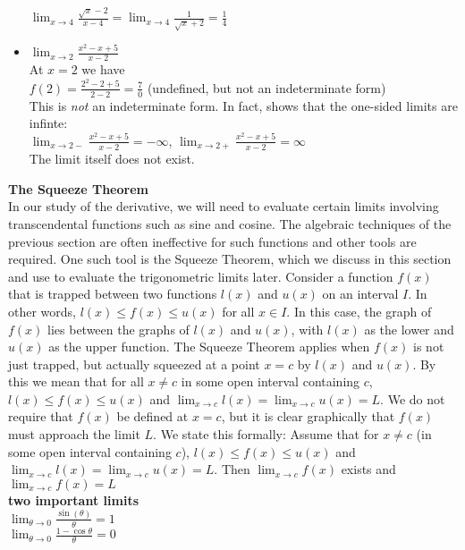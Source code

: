 \documentclass{article}
\begin{document}
\begin{itemize}
				$\lim_{x \to 4}\frac{\sqrt{x} - 2}{x - 4} = \lim_{x \to 4}\frac{1}{\sqrt{x} + 2} = \frac{1}{4}$

			\item $\lim_{x \to 2}\frac{x^2 - x + 5}{x - 2}$\\
				At $x = 2$ we have\\
				
$f(2) = \frac{2^2 - 2 + 5}{2 - 2} = \frac{7}{0}$ (undefined, but not an indeterminate form)\\
				This is \textit{not} an indeterminate form. In fact, shows that the one-sided limits are infinte:\\

				$\lim_{x \to 2-}\frac{x^2 - x + 5}{x - 2} = -\infty$, $\lim_{x \to 2+}\frac{x^2 - x + 5}{x - 2} = \infty$\\

				The limit itself does not exist.
		\end{itemize}

	\textbf{The Squeeze Theorem}\\
	In our study of the derivative, we will need to evaluate certain limits involving transcendental functions such as sine and cosine. The algebraic techniques of the previous section are often ineffective for such functions and other tools are required. One such tool is the Squeeze Theorem, which we discuss in this section and use to evaluate the trigonometric limits later. Consider a function $f(x)$ that is trapped between two functions $l(x)$ and $u(x)$ on an interval $I$. In other words, $l(x) \leq f(x) \leq u(x)$ for all $x \in I$. In this case, the graph of $f(x)$ lies between the graphs of $l(x)$ and $u(x)$, with $l(x)$ as the lower and $u(x)$ as the upper function. The Squeeze Theorem applies when $f(x)$ is not just trapped, but actually squeezed at a point $x = c$ by $l(x)$ and $u(x)$. By this we mean that for all $x \neq c$ in some open interval containing $c$, $l(x) \leq f(x) \leq u(x)$ and $\lim_{x \to c}l(x) = \lim_{x \to c}u(x) = L$. We do not require that $f(x)$ be defined at $x = c$, but it is clear graphically that $f(x)$ must approach the limit $L$. We state this formally: Assume that for $x \neq c$ (in some open interval containing $c$), $l(x) \leq f(x) \leq u(x)$ and $\lim_{x \to c}l(x) = \lim_{x \to c}u(x) = L$. Then $\lim_{x \to c}f(x)$ exists and $\lim_{x \to c}f(x) = L$\\

\textbf{two important limits}\\
	$\lim_{\theta \to 0}\frac{\sin(\theta)}{\theta} = 1$\\
	$\lim_{\theta \to 0}\frac{1 - \cos{\theta}}{\theta} = 0$\\
\end{document}
